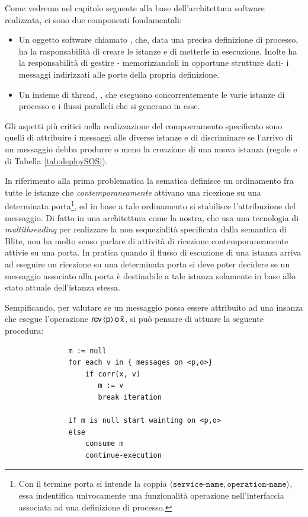 Come vedremo nel capitolo seguente alla base dell'architettura software
realizzata, ci sono due componenti fondamentali:

\begin{itemize}
  \item Un oggetto software chiamato , che, data una   
  precisa definizione di processo, ha la rasponsabilità di creare le istanze
  e di metterle in esecuzione. Inolte ha la responsabilità di gestire -
  memorizzandoli in opportune strutture dati- i messaggi indirizzati alle porte
  della propria definizione.
  \item Un insieme di thread, , che eseguono concorrentemente
  le varie istanze di processo e i flussi paralleli che si generano in esse.
\end{itemize}

Gli aspetti più critici nella realizzazione del compoeramento specificato
sono quelli di attribuire i messaggi alle diverse istanze e di discriminare se
l'arrivo di un messaggio debba produrre o meno la creazione di una nuova
istanza (regole  e  di Tabella
\ref{tab:deploySOS}).

In riferimento alla prima problematica la sematica definisce un ordinamento fra
tutte le istanze che \emph{contemporaneamente} attivano una ricezione su una
determinata porta\footnote{Con il termine porta si intende la coppia $\langle
\texttt{service-name}, \texttt{operation-name} \rangle$, essa indentifica
univocamente una funzionalità operazione nell'interfaccia associata ad una
definizione di processo.}, ed in base a tale ordinamento si stabilisce
l'attribuzione del messaggio. Di fatto in una architettura come la nostra, che
usa una tecnologia di \emph{multithreading} per realizzare la non sequezialità
specificata dalla semantica di Blite, non ha molto senso parlare di attività di
ricezione contemporaneamente attivie su una porta. In pratica quando il
flusso di escuzione di una istanza arriva ad eseguire un ricezione su una
determinata porta si deve poter decidere se un messaggio associato alla porta è
destinabile a tale istanza solamente in base allo stato attuale dell'istanza
stessa.


Sempificando, per valutare se un messaggio possa essere attribuito ad una
insanza che esegue l'operazione
${\sf rcv}\,\langle {\sf p} \rangle\, {\sf o}\, \bar{{\sf x}}$, si può pensare di attuare la seguente
procedura:

\begin{verbatim}
               m := null
               for each v in { messages on <p,o>} 
                   if corr(x, v) 
                      m := v
                      break iteration
    
               if m is null start wainting on <p,o>
               else 
                   consume m
                   continue-execution
\end{verbatim}


